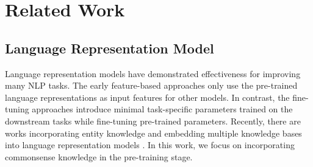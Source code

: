 \documentclass[11pt,a4paper]{article}
\begin{document}
\section{Related Work}
\subsection{Language Representation Model}
Language representation models have demonstrated effectiveness for improving many NLP tasks.
The early feature-based approaches \citep{mikolov2013distributed,pennington-etal-2014-glove,peters-etal-2018-deep} only use the pre-trained language representations as input features for other models.
In contrast, the fine-tuning approaches \citep{howard-ruder-2018-universal,radford2018improving,devlin-etal-2019-bert,yang2019xlnet} introduce minimal task-specific parameters trained on the downstream tasks while fine-tuning pre-trained parameters. 
Recently, there are works incorporating entity knowledge \citep{zhang2019ernie,sun2019ernie} and embedding multiple knowledge bases \citep{peters2019knowbert} into language representation models .
In this work, we focus on incorporating commonsense knowledge in the pre-training stage.
\end{document}
